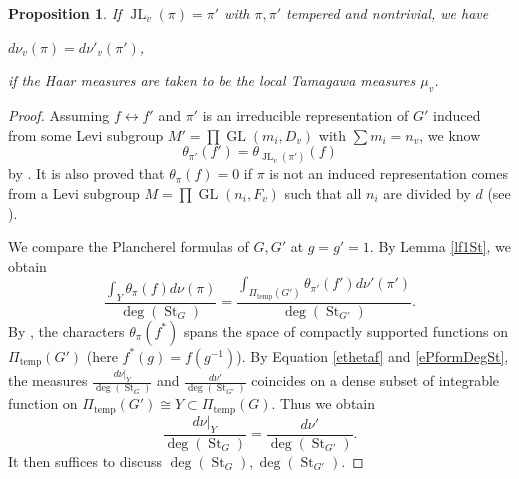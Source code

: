 \documentclass[11pt]{article}
\theoremstyle{plain}
\newtheorem{proposition}[theorem]{Proposition}
\theoremstyle{remark}
\theoremstyle{definition}
\DeclareMathOperator{\GL}{GL}
\DeclareMathOperator{\St}{St}
\DeclareMathOperator{\JL}{JL}
\DeclareMathOperator{\tp}{temp}
\begin{document}
\begin{proposition}\label{pratiopPd}
If $\JL_v(\pi)=\pi'$ with $\pi,\pi'$ tempered and nontrivial,  
we have
\begin{center}
    $d \nu_v (\pi)=d \nu'_v(\pi')$,
\end{center}
if the Haar measures are taken to be the local Tamagawa measures $\mu_v$. 
\end{proposition}
\begin{proof}
Assuming $f\leftrightarrow f'$ and $\pi'$ is an irreducible representation of $G'$ induced from some Levi subgroup $M'=\prod \GL(m_i,D_v)$ with $\sum m_i=n_v$, we know
\begin{equation}\label{ethetaf}
    \theta_{\pi'}(f')=\theta_{\JL_{v}(\pi')}(f)
\end{equation}
by \cite[Proposition 3.6]{Badu2003}.   
It is also proved that $\theta_{\pi}(f)=0$ if $\pi$ is not an induced representation comes from a Levi subgroup $M=\prod \GL(n_i,F_v)$ such that all $n_i$ are divided by $d$ (see \cite[\S 3]{Badu2003}).

We compare the Plancherel formulas of $G,G'$ at $g=g'=1$. 
By Lemma \ref{lf1St}, we obtain
\begin{equation}\label{ePformDegSt}
    \frac{\int_{Y}\theta_{\pi}(f)d \nu(\pi)}{\deg(\St_G)}=\frac{\int_{\Pi_{\tp}(G')}\theta_{\pi'}(f')d \nu'(\pi')}{\deg(\St_{G'})}. 
\end{equation}
By \cite[Lemma 3.4]{Badu2003}, the characters $\theta_{\pi}(f^*)$ spans the space of compactly supported functions on $\Pi_{\tp}(G')$ (here $f^*(g)=f(g^{-1})$). 
By Equation \eqref{ethetaf} and \eqref{ePformDegSt}, the measures $\frac{d\nu|_{Y}}{\deg(\St_G)}$ and $\frac{d\nu'}{\deg(\St_{G'})}$ coincides on a dense subset of integrable function on $\Pi_{\tp}(G')\cong Y\subset \Pi_{\tp}(G)$. 
Thus we obtain
\begin{equation}\label{edegPmeas}
    \frac{d\nu|_{Y}}{\deg(\St_G)}=\frac{d\nu'}{\deg(\St_{G'})}.
\end{equation}
It then suffices to discuss $\deg(\St_G),\deg(\St_{G'})$. 


\end{proof}
\end{document}
